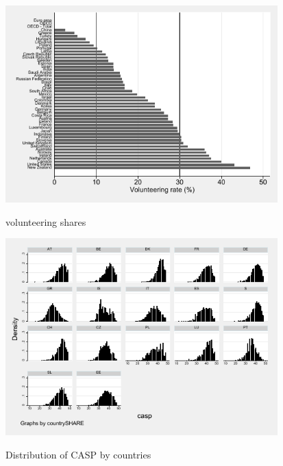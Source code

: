 \documentclass[10pt, letterpaper]{article}
\begin{document}
\begin{spacing}{1.4}
\begin{spacing}{.9}
\begin{figure}[H]
 \includegraphics[height=3in]{oecd_age50p.pdf}
 \centering
 \label{fig:oecd_50p}
\caption{volunteering shares}
\end{figure}

\begin{figure}[H]
 \includegraphics[height=3in]{hist_casp.pdf}
 \centering
 \label{fig:hist_casp}
\caption{Distribution of CASP by countries}
\end{figure}


\begin{spacing}{.9}
	 
      \label{CASP}
\end{spacing}


\begin{spacing}{.9}
	 
      \label{sphus}
\end{spacing}



\end{spacing}
\end{spacing}
\end{document}
